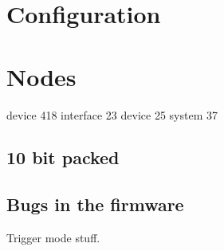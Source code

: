 \section{Configuration}

\section{Nodes}
device 418
interface 23
device 25
system 37

\subsection{10 bit packed}

\subsection{Bugs in the firmware}
Trigger mode stuff.